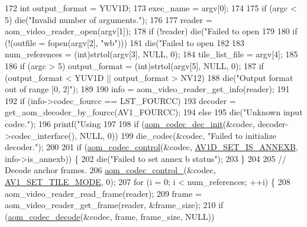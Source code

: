 \begin{DoxyCodeInclude}
{172   \textcolor{keywordtype}{int} output\_format = YUV1D;
173   exec\_name = argv[0];
174 
175   \textcolor{keywordflow}{if} (argc < 5) die(\textcolor{stringliteral}{"Invalid number of arguments."});
176 
177   reader = aom\_video\_reader\_open(argv[1]);
178   \textcolor{keywordflow}{if} (!reader) die(\textcolor{stringliteral}{"Failed to open %
179 
180   \textcolor{keywordflow}{if} (!(outfile = fopen(argv[2], \textcolor{stringliteral}{"wb"})))
181     die(\textcolor{stringliteral}{"Failed to open %
182 
183   num\_references = (int)strtol(argv[3], NULL, 0);
184   tile\_list\_file = argv[4];
185 
186   \textcolor{keywordflow}{if} (argc > 5) output\_format = (int)strtol(argv[5], NULL, 0);
187   \textcolor{keywordflow}{if} (output\_format < YUV1D || output\_format > NV12)
188     die(\textcolor{stringliteral}{"Output format out of range [0, 2]"});
189 
190   info = aom\_video\_reader\_get\_info(reader);
191 
192   \textcolor{keywordflow}{if} (info->codec\_fourcc == LST\_FOURCC)
193     decoder = get\_aom\_decoder\_by\_fourcc(AV1\_FOURCC);
194   \textcolor{keywordflow}{else}
195     die(\textcolor{stringliteral}{"Unknown input codec."});
196   printf(\textcolor{stringliteral}{"Using %
197 
198   \textcolor{keywordflow}{if} (\hyperlink{group__decoder_gafdbfca65b19ab1f6d72b32cd01753b9b}{aom\_codec\_dec\_init}(&codec, decoder->codec\_interface(), NULL, 0))
199     die\_codec(&codec, \textcolor{stringliteral}{"Failed to initialize decoder."});
200 
201   \textcolor{keywordflow}{if} (\hyperlink{group__codec_ga6da974f4eeaba1fa74106b28d0fe6ac5}{aom\_codec\_control}(&codec, \hyperlink{group__aom__decoder_gga3865fd4b3192489baa9a5c3632ebe97ba1fb269c5c5913d9995b6c35d28e2a788}{AV1D\_SET\_IS\_ANNEXB}, info->is\_annexb)) \{
202     die(\textcolor{stringliteral}{"Failed to set annex b status"});
203   \}
204 
205   \textcolor{comment}{// Decode anchor frames.}
206   \hyperlink{group__codec_ga51eb332a40dcacc39000ab8e0be36b79}{aom\_codec\_control\_}(&codec, \hyperlink{group__aom__decoder_gga3865fd4b3192489baa9a5c3632ebe97ba0795d8084ae8c78528c01587198df9e2}{AV1\_SET\_TILE\_MODE}, 0);
207   \textcolor{keywordflow}{for} (i = 0; i < num\_references; ++i) \{
208     aom\_video\_reader\_read\_frame(reader);
209     frame = aom\_video\_reader\_get\_frame(reader, &frame\_size);
210     \textcolor{keywordflow}{if} (\hyperlink{group__decoder_gab03fdb999d1f83a5896869a3ba5f68f7}{aom\_codec\_decode}(&codec, frame, frame\_size, NULL))
}}}}
\end{DoxyCodeInclude}
